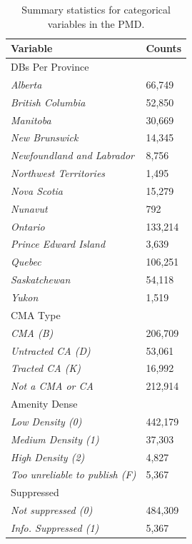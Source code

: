 \documentclass[11pt, a4paper]{article}
\begin{document}
\begin{table}[H]
\centering
\caption[Summary of categorical variables]{Summary statistics for categorical variables in the PMD.}\label{categorical}
\begin{tabular}{|l|l|}
\hline
\textbf{Variable}  & \textbf{Counts}  \\
\hline
{DBs Per Province} &  \\
\indent\indent \textit{Alberta} & 66,749 \\
\indent\indent \textit{British Columbia} & 52,850 \\
\indent\indent \textit{Manitoba} & 30,669 \\
\indent\indent \textit{New Brunswick} & 14,345 \\
\indent\indent \textit{Newfoundland and Labrador} & 8,756 \\
\indent\indent \textit{Northwest Territories} & 1,495 \\
\indent\indent \textit{Nova Scotia} & 15,279 \\
\indent\indent \textit{Nunavut} & 792 \\
\indent\indent \textit{Ontario} & 133,214 \\
\indent\indent \textit{Prince Edward Island} & 3,639 \\
\indent\indent \textit{Quebec} &  106,251 \\
\indent\indent \textit{Saskatchewan} & 54,118 \\
\indent\indent \textit{Yukon} & 1,519 \\
\hline

{CMA Type} &  \\
\indent\indent \textit{CMA (B)} & 206,709 \\
\indent\indent \textit{Untracted CA (D)} & 53,061 \\
\indent\indent \textit{Tracted CA (K)} & 16,992 \\
\indent\indent \textit{Not a CMA or CA} & 212,914 \\
\hline

{Amenity Dense} &  \\
\indent\indent \textit{Low Density (0)} & 442,179 \\
\indent\indent \textit{Medium Density (1)} & 37,303 \\
\indent\indent \textit{High Density (2)} & 4,827 \\
\indent\indent \textit{Too unreliable to publish (F)} & 5,367 \\
\hline

{Suppressed} &  \\
\indent\indent \textit{Not suppressed (0)} & 484,309 \\
\indent\indent \textit{Info. Suppressed (1)} & 5,367 \\
\hline
\end{tabular}
\end{table}
\end{document}
